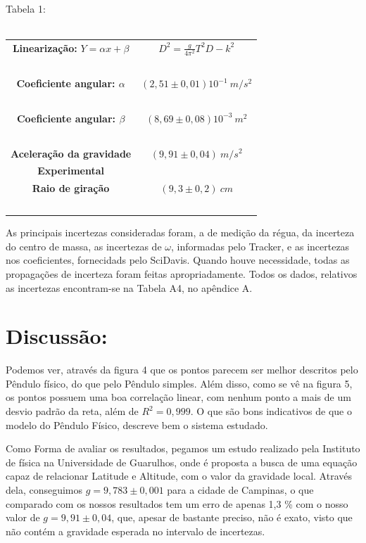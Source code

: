 \documentclass[hidelinks,a4paper,10pt]{article}
\begin{document}
\begin{center}
    Tabela 1:\\
    \ \\
\begin{tabular} {| c | c |}
    \hline
        \textbf{Linearização: }$Y = \alpha x + \beta $ & $D^2 = \frac{g}{4\pi^2}T^2D - k^2$ \\
        \ & \ \\
    \hline
        \textbf{Coeficiente angular: $\alpha$ } & $(2,51 \pm 0,01) 10^{-1} \ m/s^2$ \\
        \ & \ \\
    \hline
        \textbf{Coeficiente angular: $\beta$ } & $(8,69 \pm 0,08) 10^{-3} \ m^2$ \\
        \ & \ \\
    \hline
    \textbf{Aceleração da gravidade} & $(9,91 \pm 0,04) \ m/s^2$ \\
    \textbf{Experimental} & \ \\
    \hline
        \textbf{Raio de giração } & $(9,3 \pm 0,2)  \ cm$ \\
        \ & \ \\
    \hline        
\end{tabular}
\end{center}
\qquad As principais incertezas consideradas foram, a de medição da régua, da incerteza do centro de massa, 
as incertezas de $\omega$, informadas pelo Tracker, e as incertezas nos coeficientes, fornecidads pelo SciDavis. 
Quando houve necessidade, todas as propagações de incerteza foram feitas apropriadamente. Todos os dados, relativos as incertezas 
encontram-se na Tabela A4, no apêndice A.
\section*{Discussão:}
\qquad Podemos ver, através da figura 4 que os pontos parecem ser 
melhor descritos pelo Pêndulo físico, do que pelo Pêndulo simples. Além disso, 
como se vê na figura 5, os pontos possuem uma boa correlação linear, com nenhum ponto a mais de um desvio 
padrão da reta, além de $R^2 = 0,999$. O que são bons indicativos de que o 
modelo do Pêndulo Físico, descreve bem o sistema estudado.
\pagebreak


\qquad Como Forma de avaliar os resultados, pegamos um estudo realizado pela Instituto de física 
na Universidade de Guarulhos, onde é proposta a busca de uma equação capaz de relacionar Latitude e Altitude, 
com o valor da gravidade local. Através dela, conseguimos $g = 9,783 \pm 0,001$ para a cidade de Campinas, o que comparado com os nossos resultados tem
um erro de apenas 1,3 \% com o nosso valor de $g = 9,91 \pm 0,04$, que, apesar de bastante preciso, não é exato, visto que não contém a gravidade esperada no intervalo de incertezas.
\end{document}
